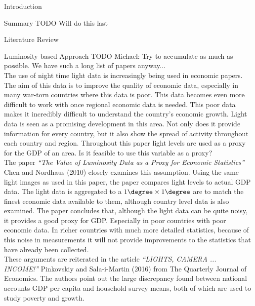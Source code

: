 \documentclass[12pt,fleqn,leqno,letterpaper]{article}
\begin{document}
\begin{section}{Introduction}
  \begin{subsection}{Summary}
    TODO Will do this last
  \end{subsection}
  \begin{subsection}{Literature Review}
    \begin{subsubsection}{Luminosity-based Approach}
      TODO Michael: Try to accumulate as much as possible. We have such a long list of papers anyway...\\
      The use of night time light data is increasingly being used in economic papers. The aim of this data is to improve the quality of economic data, especially in many war-torn countries where this data is poor. This data becomes even more difficult to work with once regional economic data is needed. This poor data makes it incredibly difficult to understand the country's economic growth. Light data is seen as a promising development in this area. Not only does it provide information for every country, but it also show the spread of activity throughout each country and region. Throughout this paper light levels are used as a proxy for the GDP of an area. Is it feasible to use this variable as a proxy? \\

      The paper \textit{``The Value of Luminosity Data as a Proxy for Economic Statistics''} Chen and Nordhaus (2010) closely examines this assumption. Using the same light images as used in this paper, the paper compares light levels to actual GDP data. The light data is aggregated to a $1\degree\times 1\degree$ are to match the finest economic data available to them, although country level data is also examined. The paper concludes that, although the light data can be quite noisy, it provides a good proxy for GDP. Especially in poor countries with poor economic data. In richer countries with much more detailed statistics, because of this noise in measurements it will not provide improvements to the statistics that have already been collected. \\

      These arguments are reiterated in the article \textit{``LIGHTS, CAMERA ... INCOME!''}  Pinkovskiy and Sala-i-Martin (2016) from The Quarterly Journal of Economics. The authors point out the large discrepancy found between national accounts GDP  per  capita and household survey means, both of which are used to study poverty and growth. \\


\end{subsubsection}
\end{subsection}
\end{section}
\end{document}
